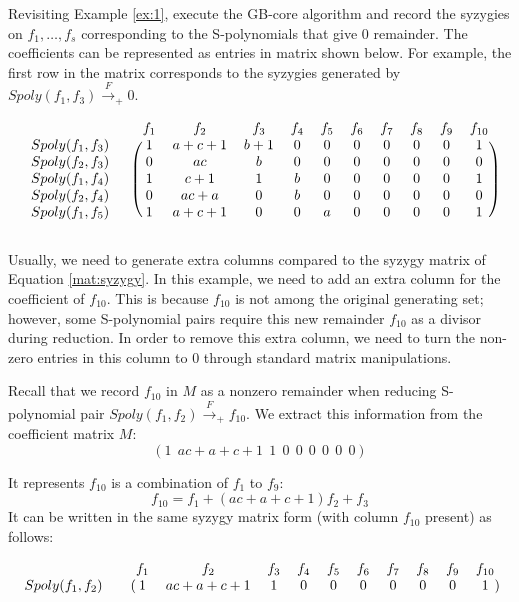  \begin{Example}
 Revisiting Example \ref{ex:1}, execute the GB-core algorithm and
 record the syzygies on $f_1,\dots,f_s$ corresponding to the
 S-polynomials that give 0 remainder. The coefficients can be
 represented as entries in matrix shown below. For example, the first
 row in the matrix corresponds to the syzygies generated by
 $Spoly(f_1,f_3)\xrightarrow{F}_+0$.  

\begin{equation}\label{eqn:sm}
 \begin{blockarray}{cccccccccccc}
  && f_1 & f_2 & f_3 & f_4 & f_5 & f_6 & f_7 & f_8 & f_9 & f_{10} \\
  \begin{block}{cc(cccccccccc)}
  Spoly(f_1,f_3)\ & & 1 & a+c+1 & b+1 &0&0&0&0&0&0&1\\
  Spoly(f_2,f_3)\ & & 0 & ac & b &0&0&0&0&0&0&0\\
  Spoly(f_1,f_4)\ & & 1 & c+1 & 1 &b&0&0&0&0&0&1\\
  Spoly(f_2,f_4)\ & & 0 & ac+a & 0 &b&0&0&0&0&0&0\\
  Spoly(f_1,f_5)\ & & 1 & a+c+1 & 0 &0&a&0&0&0&0&1\\
  \end{block}
  \end{blockarray}
\end{equation}

Usually, we need to generate extra columns compared to the syzygy
matrix of Equation \ref{mat:syzygy}. In this example, we need to add an
extra column for the coefficient of $f_{10}$. This is because $f_{10}$
is not among the original generating set; however, some S-polynomial
pairs require this new remainder $f_{10}$ as a divisor during
reduction. In order to remove this extra column, we need to turn the
non-zero entries in this column to 0 through standard matrix
manipulations. 

Recall that we record $f_{10}$ in $M$ as a nonzero remainder when
reducing S-polynomial pair $Spoly(f_1,f_2)\xrightarrow{F}_+f_{10}$. We
extract this information from the coefficient matrix $M$:
 $$(1 ~~ac+a+c+1 ~~1 ~~0 ~~0 ~~0 ~~0 ~~0 ~~0 )$$

 It represents $f_{10}$ is a combination of $f_1$ to $f_9$:
 $$f_{10} = f_1 + (ac+a+c+1)f_2 + f_3$$
 It can be written in the same syzygy matrix form (with column
 $f_{10}$ present) as follows:

\begin{equation}\label{sr}%
 \begin{blockarray}{cccccccccccc}
  && f_1 & f_2 & f_3 & f_4 & f_5 & f_6 & f_7 & f_8 & f_9 & f_{10} \\
  \begin{block}{cc(cccccccccc)}
  Spoly(f_1,f_2)& & 1 & ac+a+c+1 & 1 &0&0&0&0&0&0&1\\
  \end{block}
  \end{blockarray}
 \end{equation}


\end{Example}
